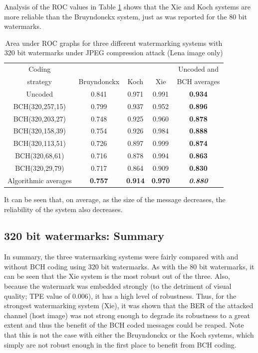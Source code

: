 \documentclass[12pt]{report}
\begin{document}
Analysis of the ROC values in Table \ref{tab:rocLenaBKX} shows that the Xie and Koch systems are 
more reliable than the Bruyndonckx system, just as was reported for the 80 bit watermarks.
\begin{table}[!t]
\setlength{\abovecaptionskip}{-0.1cm}
\tiny
        \begin{center}
                \begin{tabular}{|c|c|c|c|c|} \hline
                Coding 			& 		& 	& 	& Uncoded and \\ 
		strategy		& Bruyndonckx   & Koch  & Xie   & BCH averages \\ \hline
                Uncoded         	& 0.841         & 0.971 & 0.991 &{\bf 0.934}\\ \hline
                BCH(320,257,15) 	& 0.799         & 0.937 & 0.952 &{\bf 0.896}\\ \hline
                BCH(320,203,27) 	& 0.748         & 0.925 & 0.960 &{\bf 0.878}\\ \hline
                BCH(320,158,39) 	& 0.754         & 0.926 & 0.984 &{\bf 0.888}\\ \hline
                BCH(320,113,51) 	& 0.726         & 0.897 & 0.999 &{\bf 0.874}\\ \hline
                BCH(320,68,61)  	& 0.716         & 0.878 & 0.994 &{\bf 0.863}\\ \hline
                BCH(320,29,79)  	& 0.717         & 0.864 & 0.909 &{\bf 0.830}\\ \hline
		Algorithmic averages 	& {\bf 0.757} 	& {\bf 0.914}	& {\bf 0.970}	&{\bf \emph{0.880}}\\ \hline
                \end{tabular}
        \end{center}
	\caption{Area under ROC graphs for three different watermarking systems with 320 bit watermarks
	under JPEG compression attack (Lena image only)}
        \label{tab:rocLenaBKX}
\end{table}
\normalsize
It can be seen that, on average, as the size of the message decreases, the reliability of the system also 
decreases.


\subsection{320 bit watermarks: Summary}
In summary, the three watermarking systems were fairly compared with and without BCH coding using 320 bit watermarks. 
As with the 80 bit watermarks, it can be seen that the Xie system is the most robust out of the three.
Also, because the watermark was embedded strongly (to the detriment of visual quality; TPE value of 0.006), it has a
high level of robustness. Thus, for the strongest watermarking system (Xie), it was shown that the BER of the attacked
channel (host image) was not strong enough to degrade its robustness to a great extent and thus the benefit of the 
BCH coded messages could be reaped. Note that this is not the case with either the Bruyndonckx or the Koch systems,
which simply are not robust enough in the first place to benefit from BCH coding. 
\end{document}
